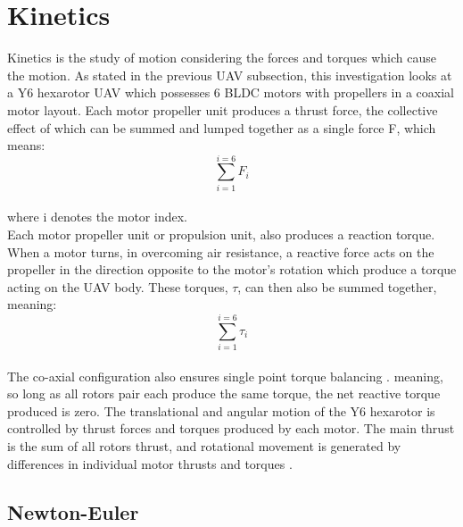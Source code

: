 \documentclass[12pt,a4paper,twoside]{report}
\begin{document}
		\section{Kinetics}
			
			Kinetics is the study of motion considering the forces and torques which cause the motion. As stated in the previous UAV subsection, this investigation looks at a Y6 hexarotor UAV which possesses 6 BLDC motors with propellers in a coaxial motor layout. Each motor propeller unit produces a thrust force, the collective effect of which can be summed and lumped together as a single force F, which means:
			\\
			\[\sum_{i = 1}^{i = 6}F_i\]
			\\
			where i denotes the motor index.
			\\
			Each motor propeller unit or propulsion unit, also produces a reaction torque. When a motor turns, in overcoming air resistance, a reactive force acts on the propeller in the direction opposite to the motor's rotation which produce a torque acting on the UAV body. These torques, $\tau$, can then also be summed together, meaning:
			\\
			\[\sum_{i = 1}^{i = 6}\tau_i\] 
			\\
			The co-axial configuration also ensures single point torque balancing \cite{6}. meaning, so long as all rotors pair each produce the same torque, the net reactive torque produced is zero. The translational and angular motion of the Y6 hexarotor is controlled by thrust forces and torques produced by each motor. The main thrust is the sum of all rotors thrust, and rotational movement is generated by differences in individual motor thrusts and torques \cite{9}.
				
			\subsection{Newton-Euler}
				
\end{document}
